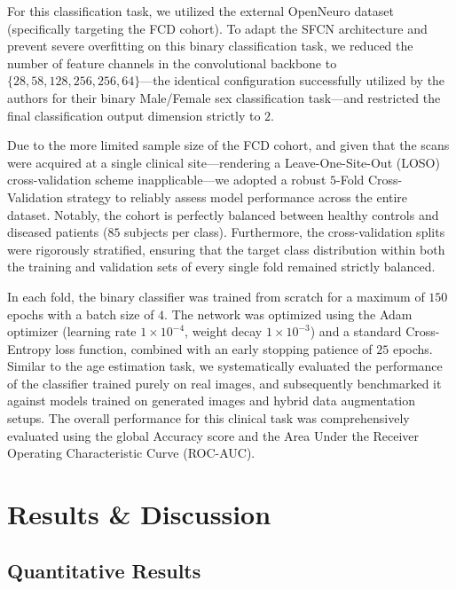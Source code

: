 \documentclass[11pt,a4paper]{article}
\begin{document}
For this classification task, we utilized the external OpenNeuro dataset (specifically targeting the FCD cohort). To adapt the SFCN architecture and prevent severe overfitting on this binary classification task, we reduced the number of feature channels in the convolutional backbone to $\{28, 58, 128, 256, 256, 64\}$—the identical configuration successfully utilized by the authors for their binary Male/Female sex classification task—and restricted the final classification output dimension strictly to $2$. 

Due to the more limited sample size of the FCD cohort, and given that the scans were acquired at a single clinical site---rendering a Leave-One-Site-Out (LOSO) cross-validation scheme inapplicable---we adopted a robust $5$-Fold Cross-Validation strategy to reliably assess model performance across the entire dataset. Notably, the cohort is perfectly balanced between healthy controls and diseased patients ($85$ subjects per class). Furthermore, the cross-validation splits were rigorously stratified, ensuring that the target class distribution within both the training and validation sets of every single fold remained strictly balanced. 

In each fold, the binary classifier was trained from scratch for a maximum of $150$ epochs with a batch size of $4$. The network was optimized using the Adam optimizer (learning rate $1 \times 10^{-4}$, weight decay $1 \times 10^{-3}$) and a standard Cross-Entropy loss function, combined with an early stopping patience of $25$ epochs. Similar to the age estimation task, we systematically evaluated the performance of the classifier trained purely on real images, and subsequently benchmarked it against models trained on generated images and hybrid data augmentation setups. The overall performance for this clinical task was comprehensively evaluated using the global Accuracy score and the Area Under the Receiver Operating Characteristic Curve (ROC-AUC).



\section{Results \& Discussion}
\label{sec: 6}

\subsection{Quantitative Results}
\end{document}
